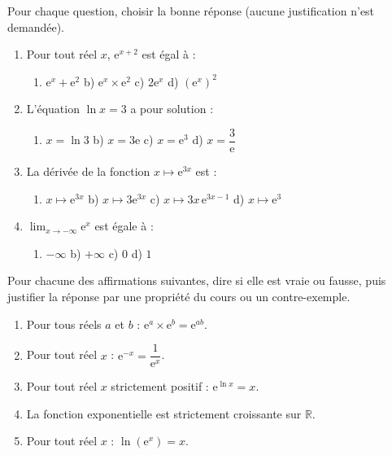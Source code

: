 \documentclass[11pt]{article}
\begin{document}
\begin{exercice}
Pour chaque question, choisir la bonne réponse (aucune justification n'est demandée).
\begin{enumerate}
\item Pour tout réel $x$, $\mathrm{e}^{x+2}$ est égal à :
\begin{enumerate}
\item[a)] $\mathrm{e}^x + \mathrm{e}^2$ \qquad b) $\mathrm{e}^x \times \mathrm{e}^2$ \qquad c) $2\mathrm{e}^x$ \qquad d) $(\mathrm{e}^x)^2$
\end{enumerate}
\item L'équation $\ln x = 3$ a pour solution :
\begin{enumerate}
\item[a)] $x = \ln 3$ \qquad b) $x = 3\mathrm{e}$ \qquad c) $x = \mathrm{e}^3$ \qquad d) $x = \dfrac{3}{\mathrm{e}}$
\end{enumerate}
\item La dérivée de la fonction $x \longmapsto \mathrm{e}^{3x}$ est :
\begin{enumerate}
\item[a)] $x \longmapsto \mathrm{e}^{3x}$ \qquad b) $x \longmapsto 3\mathrm{e}^{3x}$ \qquad c) $x \longmapsto 3x\,\mathrm{e}^{3x-1}$ \qquad d) $x \longmapsto \mathrm{e}^{3}$
\end{enumerate}
\item $\displaystyle\lim_{x \to -\infty} \mathrm{e}^{x}$ est égale à :
\begin{enumerate}
\item[a)] $-\infty$ \qquad b) $+\infty$ \qquad c) $0$ \qquad d) $1$
\end{enumerate}
\end{enumerate}
\end{exercice}

\begin{exercice}
Pour chacune des affirmations suivantes, dire si elle est vraie ou fausse, puis justifier la réponse par une propriété du cours ou un contre-exemple.
\begin{enumerate}
\item Pour tous réels $a$ et $b$ : $\mathrm{e}^{a}\times \mathrm{e}^{b} = \mathrm{e}^{ab}$.
\item Pour tout réel $x$ : $\mathrm{e}^{-x} = \dfrac{1}{\mathrm{e}^{x}}$.
\item Pour tout réel $x$ strictement positif : $\mathrm{e}^{\ln x} = x$.
\item La fonction exponentielle est strictement croissante sur $\mathbb{R}$.
\item Pour tout réel $x$ : $\ln(\mathrm{e}^{x}) = x$.
\end{enumerate}
\end{exercice}
\end{document}
